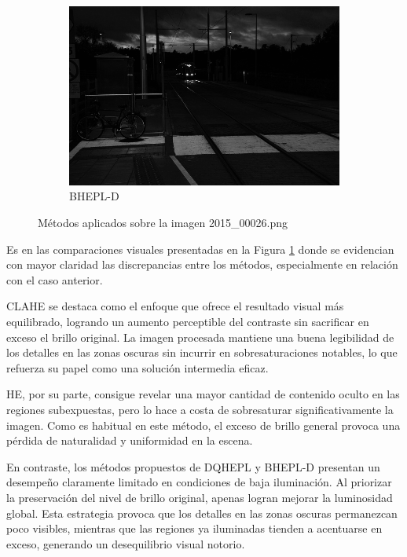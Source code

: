 \documentclass[sigchi]{acmart}
\begin{document}
\begin{figure}[htbp]
	\begin{subfigure}[b]{0.32\textwidth}
		\centering
		\includegraphics[width=\linewidth]{./procesadas/2015_00026/2015_00026_bhepl_d.png}
		\caption{BHEPL-D}
	\end{subfigure}

	\caption{Métodos aplicados sobre la imagen 2015\_00026.png}
	\label{fig:visual_026}
\end{figure}

Es en las comparaciones visuales presentadas en la Figura \ref{fig:visual_026} donde se
evidencian con mayor claridad las discrepancias entre los métodos, especialmente en relación
con el caso anterior.

CLAHE se destaca como el enfoque que ofrece el resultado visual más equilibrado, logrando un
aumento perceptible del contraste sin sacrificar en exceso el brillo original. La imagen
procesada mantiene una buena legibilidad de los detalles en las zonas oscuras sin incurrir en
sobresaturaciones notables, lo que refuerza su papel como una solución intermedia eficaz.

HE, por su parte, consigue revelar una mayor cantidad de contenido oculto en las regiones
subexpuestas, pero lo hace a costa de sobresaturar significativamente la imagen. Como es
habitual en este método, el exceso de brillo general provoca una pérdida de naturalidad y
uniformidad en la escena.

En contraste, los métodos propuestos de DQHEPL y BHEPL-D presentan un desempeño claramente
limitado en condiciones de baja iluminación. Al priorizar la preservación del nivel de brillo
original, apenas logran mejorar la luminosidad global. Esta estrategia provoca que los detalles
en las zonas oscuras permanezcan poco visibles, mientras que las regiones ya iluminadas tienden
a acentuarse en exceso, generando un desequilibrio visual notorio.
\end{document}
